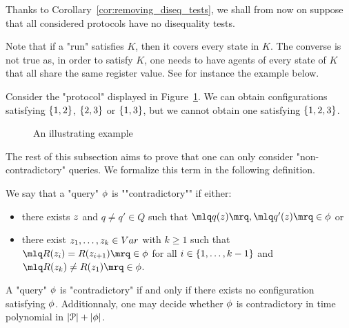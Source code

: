Thanks to Corollary~\ref{cor:removing_diseq_tests}, we shall from now on suppose that all considered protocols have no disequality tests. 


Note that if a "run" satisfies $K$, then it covers every state in $K$. The converse is not true as, in order to satisfy $K$, one needs to have agents of every state of $K$ that all share the same register value. See for instance the example below.

\begin{example}
	Consider the "protocol" displayed in Figure~\ref{fig:no-clique}.
	We can obtain configurations satisfying $\{1,2\}$, $\{2,3\}$ or $\{1,3\}$, but we cannot obtain one satisfying $\{1,2,3\}$.
	
	\begin{figure}[h]
		
		\caption{An illustrating example}
		\label{fig:no-clique}
	\end{figure}
\end{example}


The rest of this subsection aims to prove that one can only consider "non-contradictory" queries. We formalize this term in the following definition.
\begin{definition}
We say that a "query" $\phi$ is ""contradictory"" if either:
	\begin{itemize}
		\item there exists $\varz$ and $q \neq q' \in Q$ such that $\quotemarks{q(\varz)}, \quotemarks{q'(\varz)} \in \query$ or
		
		\item there exist $\var{z_1}, \ldots, \var{z_k} \in \varset$ with $k\geq 1$ such that $\quotemarks{R(\varz_{i}) = R(\varz_{i+1})} \in \query$ for all $i \in \{1,\ldots,k-1\}$ and $\quotemarks{R(\varz_k) \neq R(\varz_1)} \in \query$.
	\end{itemize}
\end{definition}

\begin{proposition}
A "query" $\phi$ is "contradictory" if and only if there exists no configuration satisfying $\phi$. Additionnaly, one may decide whether $\phi$ is contradictory in time polynomial in $|\mathcal{P}| + |\phi|$. 
\end{proposition}

